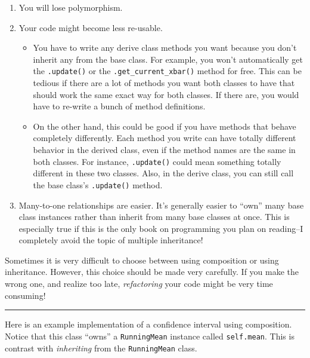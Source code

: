 \documentclass[
  12pt,
]{krantz}
\begin{document}
\begin{enumerate}
\def\labelenumi{\arabic{enumi}.}
\item
  You will lose polymorphism.
\item
  Your code might become less re-usable.

  \begin{itemize}
  \item
    You have to write any derive class methods you want because you don't inherit any from the base class. For example, you won't automatically get the \texttt{.update()} or the \texttt{.get\_current\_xbar()} method for free. This can be tedious if there are a lot of methods you want both classes to have that should work the same exact way for both classes. If there are, you would have to re-write a bunch of method definitions.
  \item
    On the other hand, this could be good if you have methods that behave completely differently. Each method you write can have totally different behavior in the derived class, even if the method names are the same in both classes. For instance, \texttt{.update()} could mean something totally different in these two classes. Also, in the derive class, you can still call the base class's \texttt{.update()} method.
  \end{itemize}
\item
  Many-to-one relationships are easier. It's generally easier to ``own'' many base class instances rather than inherit from many base classes at once. This is especially true if this is the only book on programming you plan on reading--I completely avoid the topic of multiple inheritance!
\end{enumerate}

Sometimes it is very difficult to choose between using composition or using inheritance. However, this choice should be made very carefully. If you make the wrong one, and realize too late, \emph{refactoring} your code might be very time consuming!

\begin{center}\rule{0.5\linewidth}{0.5pt}\end{center}

Here is an example implementation of a confidence interval using composition. Notice that this class ``owns'' a \texttt{RunningMean} instance called \texttt{self.mean}. This is contrast with \emph{inheriting} from the \texttt{RunningMean} class.
\end{document}

